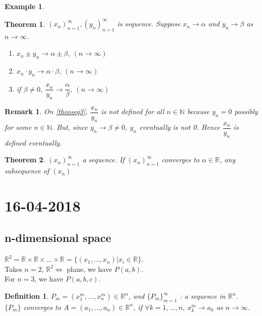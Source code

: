 \documentclass[a4paper,10pt]{article}
\newtheorem{remark}{Remark}
\newtheorem{theo}{Theorem}
\newtheorem{defi}{Definition}
\newtheorem{ex}{Example}
\newcommand{\R}{\mathbb{R}}
\newcommand{\N}{\mathbb{N}}
\begin{document}
\begin{ex}
	
\end{ex}

\begin{theo}
	$ (x_{n})_{n=1}^{\infty} , (y_{n})_{n=1}^{\infty} $ is sequence. Suppose $ x_{n} \rightarrow \alpha $ and $ y_{n} \rightarrow \beta $ as $ n\rightarrow \infty $.
	\begin{enumerate}
		\item $ x_{n} \pm y_{n} \rightarrow \alpha \pm \beta , \ (n \rightarrow \infty) $
		\item $ x_{n} \cdot y_{n} \rightarrow \alpha \cdot \beta , \ (n \rightarrow \infty) $
		\item \label{theoseq3} if $ \beta \neq 0, \ \dfrac{x_{n}}{y_{n}} \rightarrow \dfrac{\alpha}{\beta} , \ (n \rightarrow \infty) $
	\end{enumerate}
\end{theo}

\begin{remark}
	On \ref{theoseq3}, $ \dfrac{x_{n}}{y_{n}} $ is not defined for all $ n \in \N $ because $ y_{n}=0 $ possibly for some $ n \in \N $. But, since $ y_{n} \rightarrow \beta \neq 0, \ y_{n} $ eventually is not 0. Hence $ \dfrac{x_{n}}{y_{n}} $ is defined eventually.
\end{remark}

\begin{theo}
	$ (x_{n})_{n=1}^{\infty} $ a sequence. If $ (x_{n})_{n=1}^{\infty} $ converges to $ \alpha \in \R $, any subsequence of $ (x_{n}) $
\end{theo}

\section{16-04-2018}

\subsection{n-dimensional space}
$ \R^2 = \R \times \R \times \dots \times \R  = \{ (x_{1}, \dots, x_{n}) | x_{i}\in \R \} $.\\
Takes $ n=2 $, $ \R^2  \Leftrightarrow $ plane, we have $ P(a,b) $.\\
For $ n=3 $, we have $ P(a,b,c) $.

\begin{defi}
	$ P_{m} = (x_{1}^{m}, \dots, x_{n}^{m}) \in \R^n$, and $ \{ P_{m} \}_{m=1}^{\infty} $ :  a sequence in $ \R^{n} $.\\
	 $ \{P_{m}\} $ converges to $ A = (a_{1}, \dots , a_{n}) \in \R^n $, if $ \forall k=1, \dots, n , \ x_{k}^{m} \rightarrow a_{k} $ as $ n \rightarrow \infty $.
\end{defi}
\end{document}
